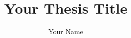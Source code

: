 \documentclass[12pt,oneside]{nusthesis}
\title{Your Thesis Title}
\author{Your Name}
\begin{document}
\begin{frontmatter}

    \maketitle


    \begin{abstract}
    
    \end{abstract}


    \begin{acknowledgments}
    
    \end{acknowledgments}

    \tableofcontents
    \listoffigures
    \listoftables

\end{frontmatter}







\begin{thebibliography}{99}

\end{thebibliography}

\appendix

\end{document}
